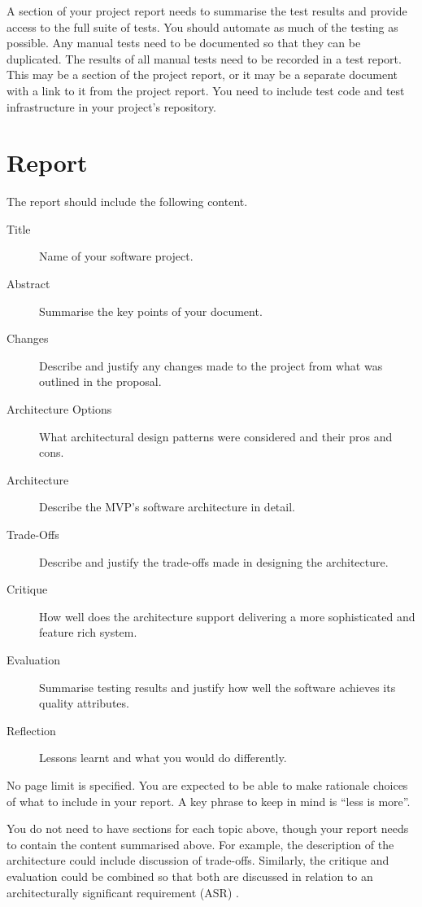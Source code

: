\documentclass{csse4400}
\begin{document}
A section of your project report needs to summarise the test results and provide access to the full suite of tests.
You should automate as much of the testing as possible.
Any manual tests need to be documented so that they can be duplicated.
The results of all manual tests need to be recorded in a test report.
This may be a section of the project report, or it may be a separate document with a link to it from the project report.
You need to include test code and test infrastructure in your project's repository.


\section{Report}
The report should include the following content.

\begin{description}
    \item[Title] Name of your software project.
    \item[Abstract] Summarise the key points of your document.
    \item[Changes] Describe and justify any changes made to the project from what was outlined in the proposal.
    \item[Architecture Options] What architectural design patterns were considered and their pros and cons.
    \item[Architecture] Describe the MVP's software architecture in detail.
    \item[Trade-Offs] Describe and justify the trade-offs made in designing the architecture.
    \item[Critique] How well does the architecture support delivering a more sophisticated and feature rich system.
    \item[Evaluation] Summarise testing results and justify how well the software achieves its quality attributes.
    \item[Reflection] Lessons learnt and what you would do differently.
\end{description}

No page limit is specified.
You are expected to be able to make rationale choices of what to include in your report.
A key phrase to keep in mind is ``less is more''.

You do not need to have sections for each topic above, though your report needs to contain the content summarised above.
For example, the description of the architecture could include discussion of trade-offs.
Similarly, the critique and evaluation could be combined so that both are discussed in relation to an architecturally significant requirement (ASR) \cite{view-notes}.
\end{document}
